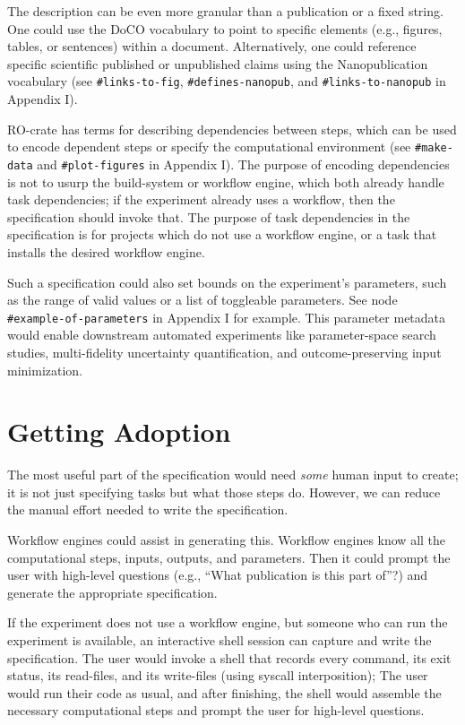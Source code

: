 \documentclass[manuscript,authordraft]{acmart}
\begin{document}
The description can be even more granular than a publication or a fixed
string. One could use the DoCO vocabulary
\cite{constantin_document_2016} to point to specific elements (e.g.,
figures, tables, or sentences) within a document. Alternatively, one
could reference specific scientific published or unpublished claims
using the Nanopublication vocabulary \cite{groth_anatomy_2010} (see
\texttt{\#links-to-fig}, \texttt{\#defines-nanopub}, and
\texttt{\#links-to-nanopub} in Appendix I).

RO-crate \cite{soiland-reyes_wf4ever_2013} has terms for describing
dependencies between steps, which can be used to encode dependent steps
or specify the computational environment (see \texttt{\#make-data} and
\texttt{\#plot-figures} in Appendix I). The purpose of encoding
dependencies is not to usurp the build-system or workflow engine, which
both already handle task dependencies; if the experiment already uses a
workflow, then the specification should invoke that. The purpose of task
dependencies in the specification is for projects which do not use a
workflow engine, or a task that installs the desired workflow engine.

Such a specification could also set bounds on the experiment's
parameters, such as the range of valid values or a list of toggleable
parameters. See node \texttt{\#example-of-parameters} in Appendix I for
example. This parameter metadata would enable downstream automated
experiments like parameter-space search studies, multi-fidelity
uncertainty quantification, and outcome-preserving input minimization.

\hypertarget{getting-adoption}{%
\section{Getting Adoption}\label{getting-adoption}}

The most useful part of the specification would need \emph{some} human
input to create; it is not just specifying tasks but what those steps
do. However, we can reduce the manual effort needed to write the
specification.

Workflow engines could assist in generating this. Workflow engines know
all the computational steps, inputs, outputs, and parameters. Then it
could prompt the user with high-level questions (e.g., ``What
publication is this part of''?) and generate the appropriate
specification.

If the experiment does not use a workflow engine, but someone who can
run the experiment is available, an interactive shell session can
capture and write the specification. The user would invoke a shell that
records every command, its exit status, its read-files, and its
write-files (using syscall interposition); The user would run their code
as usual, and after finishing, the shell would assemble the necessary
computational steps and prompt the user for high-level questions.
\end{document}

